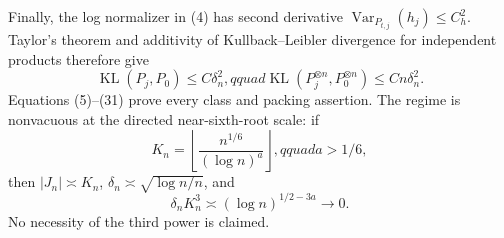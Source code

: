 Finally, the log normalizer in (4) has second derivative \(\operatorname{Var}_{P_{t,j}}(h_j)\leq C_h^2\).  Taylor's theorem and additivity of Kullback--Leibler divergence for independent products therefore give
\[
 \operatorname{KL}(P_j,P_0)\leq C\delta_n^2,qquad
 \operatorname{KL}(P_j^{\otimes n},P_0^{\otimes n})\leq Cn\delta_n^2.                  \tag{31}
\]
Equations (5)--(31) prove every class and packing assertion.  The regime is nonvacuous at the directed near-sixth-root scale: if
\[
 K_n=\left\lfloor\frac{n^{1/6}}{(\log n)^a}\right\rfloor,qquad a>1/6,
\]
then \(|J_n|\asymp K_n\), \(\delta_n\asymp\sqrt{\log n/n}\), and
\[
 \delta_nK_n^3\asymp(\log n)^{1/2-3a}\longrightarrow0.                                \tag{32}
\]
No necessity of the third power is claimed.